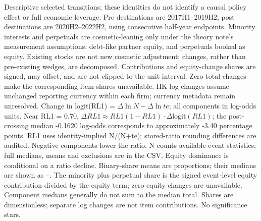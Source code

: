 \begin{table}[!htbp]
\begin{threeparttable}
\begin{tablenotes}[flushleft]
\item[] Descriptive selected transitions; these identities do not identify a causal policy effect or full economic leverage. Pre destinations are 2017H1--2019H2; post destinations are 2020H2--2022H2, using consecutive half-year endpoints. Minority interests and perpetuals are cosmetic-leaning only under the theory note's measurement assumptions: debt-like partner equity, and perpetuals booked as equity. Existing stocks are not new cosmetic adjustment; changes, rather than pre-existing wedges, are decomposed. Contributions and equity-change shares are signed, may offset, and are not clipped to the unit interval. Zero total changes make the corresponding item shares unavailable. HK log changes assume unchanged reporting currency within each firm; currency metadata remain unresolved. Change in logit(RL1) = $\Delta\ln N - \Delta\ln te$; all components in log-odds units. Near RL1 = 0.70, $\Delta RL1 \approx RL1(1-RL1)\cdot\Delta\mathrm{logit}(RL1)$; the post-crossing median -0.1620 log-odds corresponds to approximately -3.40 percentage points. RL1 uses identity-implied N/(N+te); stored-ratio rounding differences are audited. Negative components lower the ratio. N counts available event statistics; full medians, means and exclusions are in the CSV. Equity dominance is conditional on a ratio decline. Binary-share means are proportions; their medians are shown as --. The minority plus perpetual share is the signed event-level equity contribution divided by the equity term; zero equity changes are unavailable.  Component medians generally do not sum to the median total. Shares are dimensionless; separate log changes are not item contributions. No significance stars.
\end{tablenotes}
\end{threeparttable}
\end{table}

